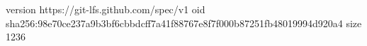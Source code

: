 version https://git-lfs.github.com/spec/v1
oid sha256:98e70ce237a9b3bf6cbbdcff7a41f88767e8f7f000b87251fb48019994d920a4
size 1236
